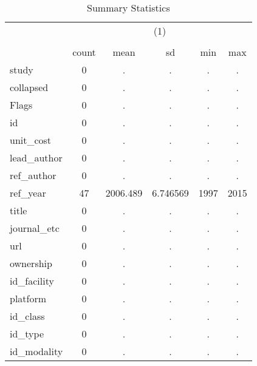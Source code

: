 \begin{table}[htbp]\centering
\def\sym#1{\ifmmode^{#1}\else\(^{#1}\)\fi}
\caption{Summary Statistics}
\begin{tabular}{l*{1}{ccccc}}
\hline\hline
            &\multicolumn{5}{c}{(1)}                                         \\
            &\multicolumn{5}{c}{}                                            \\
            &       count&        mean&          sd&         min&         max\\
\hline
study       &           0&           .&           .&           .&           .\\
collapsed   &           0&           .&           .&           .&           .\\
Flags       &           0&           .&           .&           .&           .\\
id          &           0&           .&           .&           .&           .\\
unit\_cost   &           0&           .&           .&           .&           .\\
lead\_author &           0&           .&           .&           .&           .\\
ref\_author  &           0&           .&           .&           .&           .\\
ref\_year    &          47&    2006.489&    6.746569&        1997&        2015\\
title       &           0&           .&           .&           .&           .\\
journal\_etc &           0&           .&           .&           .&           .\\
url         &           0&           .&           .&           .&           .\\
ownership   &           0&           .&           .&           .&           .\\
id\_facility &           0&           .&           .&           .&           .\\
platform    &           0&           .&           .&           .&           .\\
id\_class    &           0&           .&           .&           .&           .\\
id\_type     &           0&           .&           .&           .&           .\\
id\_modality &           0&           .&           .&           .&           .\\

\end{tabular}
\end{table}
